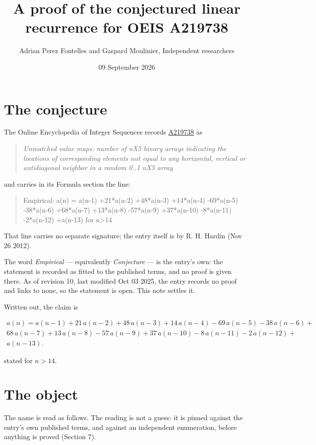 \documentclass[11pt]{article}
\title{A proof of the conjectured linear recurrence for OEIS A219738}
\author{Adrian Perez Fontelles and Gaspard Moulinier, Independent researchers}
\date{09 September 2026}
\theoremstyle{definition}
\begin{document}
\maketitle
\section{The conjecture}

The Online Encyclopedia of Integer Sequences records \href{https://oeis.org/A219738}{A219738} as

\begin{quote}\itshape Unmatched value maps: number of nX5 binary arrays indicating the locations of corresponding elements not equal to any horizontal, vertical or antidiagonal neighbor in a random 0..1 nX5 array\end{quote}

and carries in its Formula section the line:

\begin{quote}\ttfamily Empirical: a(n) = a(n-1) +21*a(n-2) +48*a(n-3) +14*a(n-4) -69*a(n-5) -38*a(n-6) +68*a(n-7) +13*a(n-8) -57*a(n-9) +37*a(n-10) -8*a(n-11) -2*a(n-12) +a(n-13) for n>14\end{quote}

That line carries no separate signature; the entry itself is by R. H. Hardin (Nov 26 2012).

The word {\itshape Empirical} --- equivalently {\itshape Conjecture} --- is the entry's own: the statement is recorded as fitted to the published terms, and no proof is given there. As of revision 10, last modified Oct 03 2025, the entry records no proof and links to none, so the statement is open. This note settles it.

Written out, the claim is

\begin{multline*} a(n) = a(n-1) + 21\,a(n-2) + 48\,a(n-3) + 14\,a(n-4) - 69\,a(n-5) - 38\,a(n-6) + \\ 68\,a(n-7) + 13\,a(n-8) - 57\,a(n-9) + 37\,a(n-10) - 8\,a(n-11) - 2\,a(n-12) + \\ a(n-13). \end{multline*}

stated for $n > 14$.

\section{The object}

The name is read as follows. The reading is not a guess: it is pinned against the entry's own published terms, and against an independent enumeration, before anything is proved (Section 7).
\end{document}
